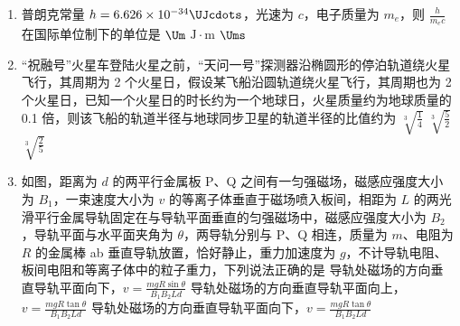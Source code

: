 \documentclass[\gkver]{gaokaozhenti}
\begin{document}
\begin{enumerate}
\item
普朗克常量 $h=6.626\times10^{-34}\UJcdots$，光速为 $c$，电子质量为 $m_{e}$，则 $\frac{h}{m_{e}c}$ 在国际单位制下的单位是
\fourchoices[answer=B]
{$\UJcdots$}
{$\Um$}
{$\mathrm{J}\cdot\mathrm{m}$}
{$\Ums$}


\item
“祝融号”火星车登陆火星之前，“天问一号”探测器沿椭圆形的停泊轨道绕火星飞行，其周期为 2 个火星日，假设某飞船沿圆轨道绕火星飞行，其周期也为 2 个火星日，已知一个火星日的时长约为一个地球日，火星质量约为地球质量的 0.1 倍，则该飞船的轨道半径与地球同步卫星的轨道半径的比值约为
{$\sqrt[3]{\frac{1}{4}}$}
{$\sqrt[3]{\frac{5}{2}}$}
{$\sqrt[3]{\frac{2}{5}}$}


\item
如图，距离为 $d$ 的两平行金属板 P、Q 之间有一匀强磁场，磁感应强度大小为 $B_{1}$，一束速度大小为 $v$ 的等离子体垂直于磁场喷入板间，相距为 $L$ 的两光滑平行金属导轨固定在与导轨平面垂直的匀强磁场中，磁感应强度大小为 $B_{2}$，导轨平面与水平面夹角为 $\theta$，两导轨分别与 P、Q 相连，质量为 $m$、电阻为 $R$ 的金属棒 ab 垂直导轨放置，恰好静止，重力加速度为 $g$，不计导轨电阻、板间电阻和等离子体中的粒子重力，下列说法正确的是
{导轨处磁场的方向垂直导轨平面向下，$v=\frac{mgR\sin\theta}{B_{1}B_{2}Ld}$}
{导轨处磁场的方向垂直导轨平面向上，$v=\frac{mgR\tan\theta}{B_{1}B_{2}Ld}$}
{导轨处磁场的方向垂直导轨平面向下，$v=\frac{mgR\tan\theta}{B_{1}B_{2}Ld}$}


\end{enumerate}
\end{document}
